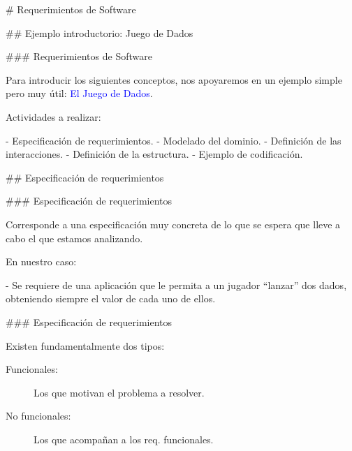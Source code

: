 # Requerimientos de Software

## Ejemplo introductorio: Juego de Dados

### Requerimientos de Software

\newline

Para introducir los siguientes conceptos, nos apoyaremos en un ejemplo simple pero muy útil:
\textcolor{blue}{El Juego de Dados}.\newline

Actividades a realizar:

- Especificación de requerimientos.
- Modelado del dominio.
- Definición de las interacciones.
- Definición de la estructura.
- Ejemplo de codificación.


## Especificación de requerimientos

### Especificación de requerimientos

\newline

Corresponde a una especificación muy concreta de lo que se espera que lleve a cabo el
 que estamos analizando.\newline

En nuestro caso:

- Se requiere de una aplicación que le permita a un jugador ``lanzar'' dos dados, obteniendo
siempre el valor de cada uno de ellos.


### Especificación de requerimientos

\newline

Existen fundamentalmente dos tipos:

\begin{rboxx}{}
\begin{description}
    \item[Funcionales:] Los que motivan el problema a resolver.
\end{description}
\end{rboxx}

\begin{rboxx}{}
\begin{description}
    \item[No funcionales:] Los que acompañan a los req. funcionales.
\end{description}
\end{rboxx}

